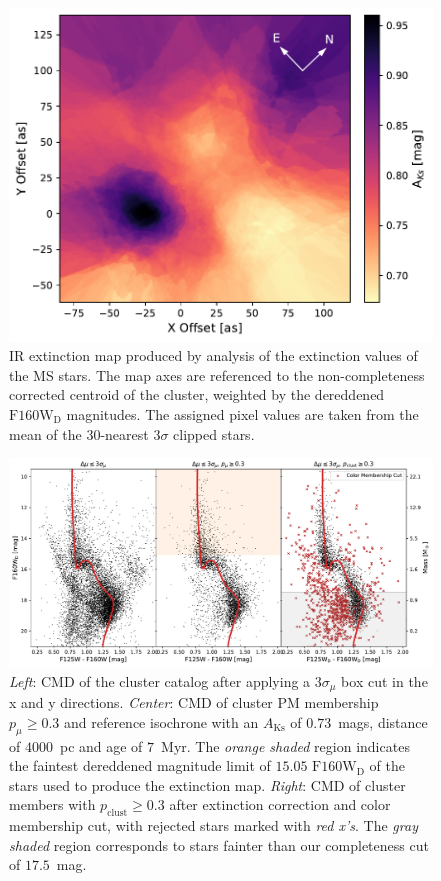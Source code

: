 \documentclass[12pt]{ucsddissertation}
\newcommand{\AKs}{A_{\mathrm{Ks}}}
\newcommand{\pclust}{p_{\mathrm{clust}}}
\begin{document}
\begin{CJK*}{UTF8}{gbsn}
\begin{figure}[htb!]
\centering
\includegraphics[width = 0.7\linewidth]{figures/chapter2/F125W_Redmap_w_ne.pdf}
\caption[Infrared extinction map of Westerlund 1]{IR extinction map produced by analysis of the extinction values of the MS stars. The map axes are referenced to the non-completeness corrected centroid of the cluster, weighted by the dereddened $\mathrm{F160W_D}$ magnitudes. The assigned pixel values are taken from the mean of the $30$-nearest $3\sigma$ clipped stars.}
\label{fig:wd1_red_map}
\end{figure} 


\begin{figure}[htb!]
\centering
\includegraphics[width = \textwidth]{figures/chapter2/CMD_3_Panel.pdf}
\caption[Color-magnitude diagram of Westerlund 1]{{\em Left}: CMD of the cluster catalog after applying a $3\sigma_{\mu}$ box cut in the x and y directions. {\em Center}: CMD of cluster PM membership $p_\mu \geq 0.3$ and reference isochrone with an $\AKs$ of $0.73$~mags, distance of $4000$~pc and age of $7$~Myr. The {\em orange shaded} region indicates the faintest dereddened magnitude limit of $15.05$ $\mathrm{F160W_D}$ of the stars used to produce the extinction map. {\em Right}: CMD of cluster members with $\pclust \geq 0.3$ after extinction correction and color membership cut, with rejected stars marked with {\em red x's}. The {\em gray shaded} region corresponds to stars fainter than our completeness cut of $17.5$~mag.}
\label{fig:3_panel_population}
\end{figure}



\end{CJK*}
\end{document}
